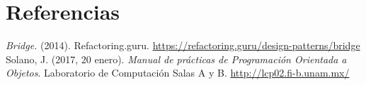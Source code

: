 \documentclass[11pt, twocolumn]{article}
\begin{document}
  \section*{Referencias}
  \begin{small}
    \textit{Bridge.} (2014). Refactoring.guru. \url{https://refactoring.guru/design-patterns/bridge} \\

    Solano, J. (2017, 20 enero). \textit{Manual de prácticas de Programación Orientada a Objetos}. Laboratorio de Computación Salas A y B. \url{http://lcp02.fi-b.unam.mx/} \\
  \end{small}
\end{document}
